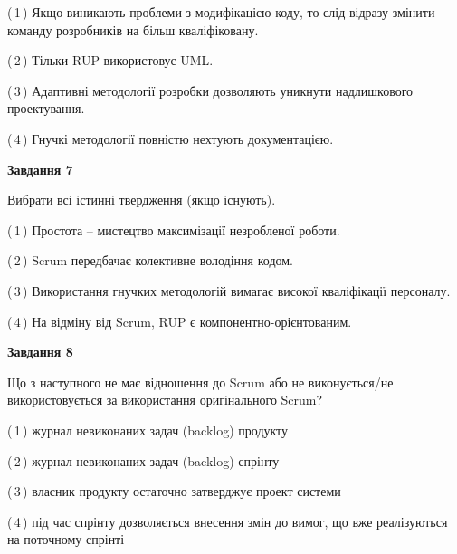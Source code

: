 \documentclass[10pt, ukrainian]{article}
\begin{document}
{\begin {large}
(\,1\,) Якщо виникають проблеми з модифікацією коду, то слід відразу змінити команду розробників на більш кваліфіковану.%



(\,2\,) Тільки RUP використовує UML.%



(\,3\,) Адаптивні методології розробки дозволяють уникнути надлишкового проектування. %



(\,4\,) Гнучкі методології повністю нехтують документацією. %


{\begin {center}\textbf{Завдання 7}\end {center}}\par
Вибрати всі істинні твердження (якщо існують).\par
\vspace{2mm}



(\,1\,) Простота – мистецтво максимізації незробленої роботи. %



(\,2\,) Scrum передбачає колективне володіння кодом. %



(\,3\,) Використання гнучких методологій вимагає високої кваліфікації персоналу. %



(\,4\,) На відміну від Scrum, RUP є компонентно-орієнтованим. %


{\begin {center}\textbf{Завдання 8}\end {center}}\par
Що з наступного не має відношення до Scrum або не виконується/не використовується за використання оригінального Scrum?\par
\vspace{2mm}



(\,1\,) журнал невиконаних задач (backlog) продукту%



(\,2\,) журнал невиконаних задач (backlog) спрінту%



(\,3\,) власник продукту остаточно затверджує проект системи%



(\,4\,) під час спрінту дозволяється внесення змін до вимог, що вже реалізуються на поточному спрінті%



\end{large}}
\end{document}
